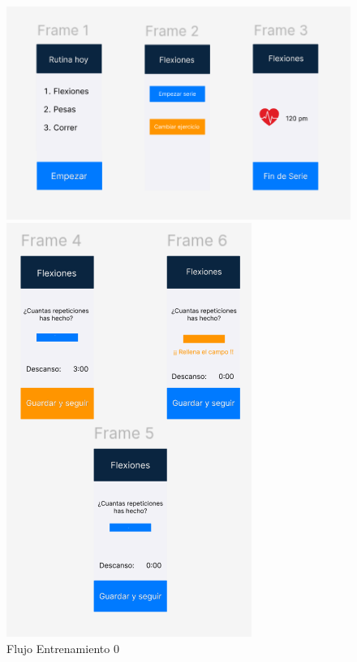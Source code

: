 \begin{figure}[H]
  \begin{minipage}[b]{0.45\textwidth}
    \centering
    \includegraphics[width=\textwidth]{fotos/FE0.png}
    \caption{Flujo Entrenamiento 0}
    \label{fig:Flujo Entrenamiento 0}
  \end{minipage}
  \begin{minipage}[b]{0.45\textwidth}
    \centering
    \includegraphics[width=\textwidth]{fotos/FE1.png}

\end{minipage}
\end{figure}
